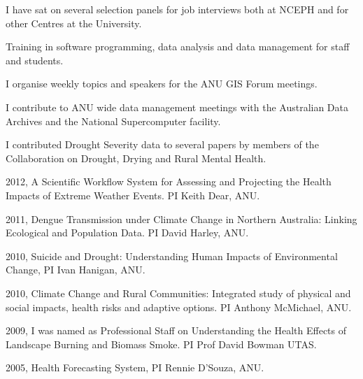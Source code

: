 \documentclass[a4paper,11pt]{article}
\begin{document}
\medskip
\renewcommand{\labelenumi}{\textsc{k}\theenumi.}
\begin{revnumerate}

\item I have sat on several selection panels for job interviews both at NCEPH and for other Centres at the University.

\item Training in software programming, data analysis and data management for staff and students.

\item I organise weekly topics and speakers for the ANU GIS Forum meetings.

\item I contribute to ANU wide data management meetings with the Australian Data Archives and the National Supercomputer facility.

\item I contributed Drought Severity data to several papers by members of the Collaboration on Drought, Drying and Rural Mental Health.
\end{revnumerate}
\bigskip
{}
\medskip
\renewcommand{\labelenumi}{\textsc{l}\theenumi.}
\begin{revnumerate}
\item 2012, A Scientific Workflow System for Assessing and Projecting the Health Impacts of Extreme Weather Events. PI Keith Dear, ANU.	
\item 2011, Dengue Transmission under Climate Change in Northern Australia: Linking Ecological and Population Data. PI David Harley, ANU.	
\item 2010, Suicide and Drought: Understanding Human Impacts of Environmental Change, PI Ivan Hanigan, ANU.	
\item 2010, Climate Change and Rural Communities: Integrated study of physical and social impacts, health risks and adaptive options. PI Anthony McMichael, ANU. 	
\item 2009, I was named as Professional Staff on Understanding the Health Effects of Landscape Burning and Biomass Smoke. PI Prof David Bowman UTAS. 	
\item 2005, Health Forecasting System,	PI Rennie D'Souza, ANU.

\end{revnumerate}
\end{document}

